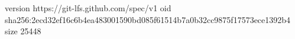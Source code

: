 version https://git-lfs.github.com/spec/v1
oid sha256:2ecd32ef16c6b4ea483001590bd085f61514b7a0b32cc9875f17573ece1392b4
size 25448

